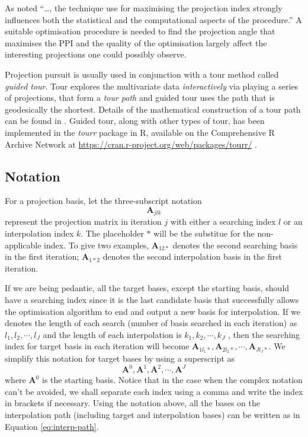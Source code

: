 \documentclass[12pt]{article}
\begin{document}
As \citet{friedman1974projection} noted ``\ldots{}, the technique use
for maximising the projection index strongly influences both the
statistical and the computational aspects of the procedure.'' A suitable
optimisation procedure is needed to find the projection angle that
maximises the PPI and the quality of the optimisation largely affect the
interesting projections one could possibly observe.

Projection pursuit is usually used in conjunction with a tour method
called \emph{guided tour}. Tour explores the multivariate data
\emph{interactively} via playing a series of projections, that form a
\emph{tour path} and guided tour uses the path that is geodesically the
shortest. Details of the mathematical construction of a tour path can be
found in \citet{buja2005computational}. Guided tour, along with other
types of tour, has been implemented in the \emph{tourr} package in R,
available on the Comprehensive R Archive Network at
\url{https://cran.r-project.org/web/packages/tourr/}
\citep{wickham2011tourrpackage}.

\hypertarget{notation}{%
\subsection{Notation}\label{notation}}

For a projection basis, let the three-subscript notation
\[\mathbf{A}_{jlk}\] represent the projection matrix in iteration \(j\)
with either a searching index \(l\) or an interpolation index \(k\). The
placeholder \(*\) will be the substitue for the non-applicable index. To
give two examples, \(\mathbf{A}_{12*}\) denotes the second searching
basis in the first iteration; \(\mathbf{A}_{1*2}\) denotes the second
interpolation basis in the first iteration.

If we are being pedantic, all the target bases, except the starting
basis, should have a searching index since it is the last candidate
basis that successfully allows the optimisation algorithm to end and
output a new basis for interpolation. If we denotes the length of each
search (number of basis searched in each iteration) as
\(l_1, l_2, \cdots, l_J\) and the length of each interpolation is
\(k_1, k_2, \cdots, k_J\) , then the searching index for target basis in
each iteration will become
\(\mathbf{A}_{1l_1*}, \mathbf{A}_{2l_2*}, \cdots, \mathbf{A}_{Jl_J*}\).
We simplify this notation for target bases by using a superscript as
\[\mathbf{A}^{0}, \mathbf{A}^{1}, \mathbf{A}^{2}, \cdots, \mathbf{A}^{J}\]
where \(\mathbf{A}^{0}\) is the starting basis. Notice that in the case
when the complex notation can't be avoided, we shall separate each index
using a comma and write the index in brackets if necessary. Using the
notation above, all the bases on the interpolation path (including
target and interpolation bases) can be written as in Equation
\ref{eq:interp-path}.
\end{document}
